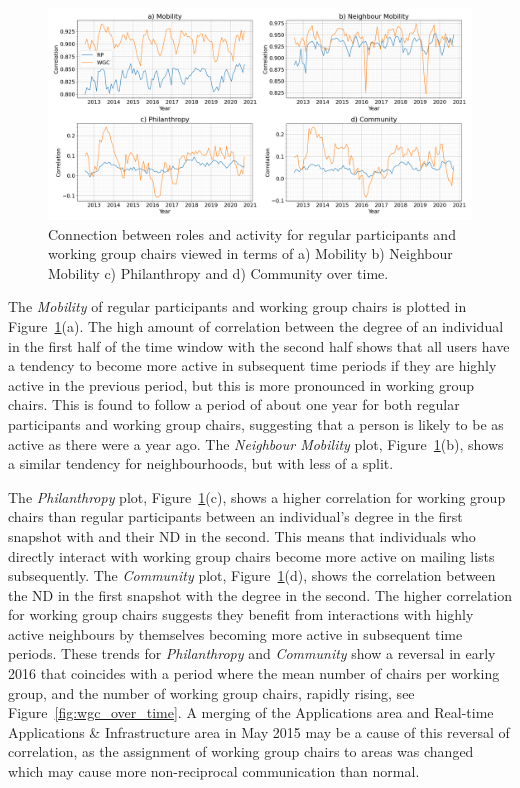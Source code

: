 \documentclass[twocolumn,10pt]{article}
\newlength{\figureWidthTwoColumn}
\begin{document}
\begin{figure}[t]
  \centering
  \includegraphics[width=\figureWidthTwoColumn]{figures-prev/icwsm-2024/hierarchy_status_comparison.png}
  \caption{
    Connection between roles and activity for regular participants and
    working group chairs viewed in terms of a) Mobility b) Neighbour
    Mobility c) Philanthropy and d) Community over time.
  }
  \label{fig:mob_tax}
\end{figure}

The \textit{Mobility} of regular participants and working group chairs is
plotted in Figure~\ref{fig:mob_tax}(a). The high amount of correlation
between the degree of an individual in the first half of the time window
with the second half shows that all users have a tendency to become more
active in subsequent time periods if they are highly active in the previous
period, but this is more pronounced in working group chairs. This is found
to follow a period of about one year for both regular participants and
working group chairs, suggesting that a person is likely to be as active as
there were a year ago. The \textit{Neighbour Mobility} plot,
Figure~\ref{fig:mob_tax}(b), shows a similar tendency for neighbourhoods, but
with less of a split.

The \textit{Philanthropy} plot, Figure~\ref{fig:mob_tax}(c), shows a higher
correlation for working group chairs than regular participants between an
individual's degree in the first snapshot with and their ND in the second.
This means that individuals who directly interact with working group chairs
become more active on mailing lists subsequently. The \textit{Community}
plot, Figure~\ref{fig:mob_tax}(d), shows the correlation between the ND in
the first snapshot with the degree in the second.  The higher correlation
for working group chairs suggests they benefit from interactions with
highly active neighbours by themselves becoming more active in subsequent
time periods. These trends for \textit{Philanthropy} and \textit{Community}
show a reversal in early 2016 that coincides with a period where the mean
number of chairs per working group, and the number of working group chairs,
rapidly rising, see Figure~\ref{fig:wgc_over_time}. A merging of the
Applications area and Real-time Applications \& Infrastructure area in May
2015 may be a cause of this reversal of correlation, as the assignment of
working group chairs to areas was changed which may cause more non-reciprocal 
communication than normal.
\end{document}
